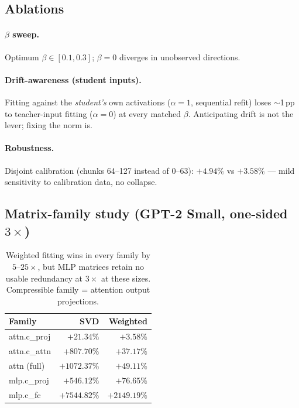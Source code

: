 \documentclass[11pt]{article}
\begin{document}
\subsection{Ablations}\label{sec:ablations}

\paragraph{$\beta$ sweep.} Optimum $\beta \in [0.1, 0.3]$; $\beta=0$
diverges in unobserved directions.

\paragraph{Drift-awareness (student inputs).} Fitting against the
\emph{student's} own activations ($\alpha=1$, sequential refit) loses
$\sim$1\,pp to teacher-input fitting ($\alpha=0$) at every matched $\beta$.
Anticipating drift is not the lever; fixing the norm is.

\paragraph{Robustness.} Disjoint calibration (chunks 64--127 instead of
0--63): $+4.94\%$ vs $+3.58\%$ --- mild sensitivity to calibration data,
no collapse.

\subsection{Matrix-family study (GPT-2 Small, one-sided $3\times$)}\label{sec:families}

\begin{table}[h]
\centering
\begin{tabular}{lrr}
\toprule
Family & SVD & Weighted \\
\midrule
attn.c\_proj & $+21.34\%$  & $\mathbf{+3.58\%}$ \\
attn.c\_attn & $+807.70\%$ & $+37.17\%$ \\
attn (full)  & $+1072.37\%$& $+49.11\%$ \\
mlp.c\_proj  & $+546.12\%$ & $+76.65\%$ \\
mlp.c\_fc    & $+7544.82\%$& $+2149.19\%$ \\
\bottomrule
\end{tabular}
\caption{Weighted fitting wins in every family by $5$--$25\times$, but MLP
matrices retain no usable redundancy at $3\times$ at these sizes.
Compressible family = attention output projections.}
\label{tab:families}
\end{table}
\end{document}
